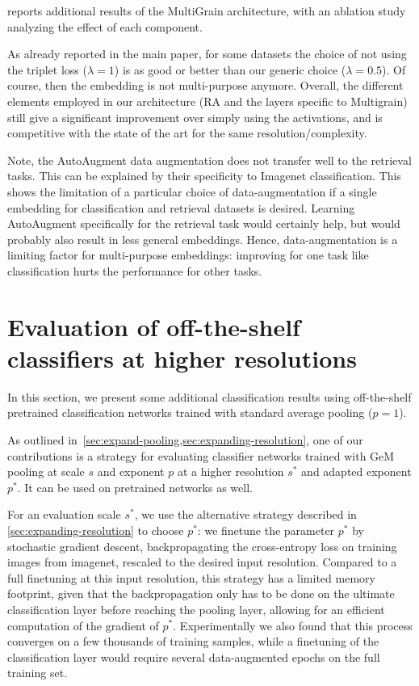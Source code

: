  reports additional results of the MultiGrain architecture, with an ablation study analyzing the effect of each component. 

As already reported in the main paper, for some datasets the choice of not using the triplet loss ($\lambda=1$) is as good or better than our generic choice ($\lambda=0.5$). 
Of course, then the embedding is not multi-purpose anymore. 
Overall, the different elements employed in our architecture (RA and the layers specific to Multigrain) still give a significant improvement over simply using the activations, and is competitive with the state of the art for the same resolution/complexity. 

Note, the AutoAugment data augmentation does not transfer well to the retrieval tasks. 
This can be explained by their specificity to Imagenet classification. 
This shows the limitation of a particular choice of data-augmentation  if a single embedding for classification and retrieval datasets is desired. 
Learning AutoAugment specifically for the retrieval task would certainly help, but would probably also result in less general embeddings. Hence, data-augmentation is a limiting factor for multi-purpose embeddings: improving for one task like classification hurts the performance for other  tasks. 


%






\section{Evaluation of off-the-shelf classifiers at higher resolutions\label{sec:extra-classif}}

In this section, we present some additional classification results using off-the-shelf pretrained classification networks trained with standard average pooling ($p=1$).

As outlined in~\cref{sec:expand-pooling,sec:expanding-resolution}, one of our contributions is a strategy for evaluating classifier networks trained with GeM pooling at scale $s$ and exponent $p$ at a higher resolution $s^*$ and adapted exponent $p^*$. 
It can be used on pretrained networks as well.

For an evaluation scale $s^*$, we use the alternative strategy described in \cref{sec:expanding-resolution} to choose $p^*$: 
we finetune the parameter $p^*$ by stochastic gradient descent, backpropagating the cross-entropy loss on training images from imagenet, rescaled to the desired input resolution. 
Compared to a full finetuning at this input resolution, this strategy has a limited memory footprint, given that the backpropagation only has to be done on the ultimate classification layer before reaching the pooling layer, allowing for an efficient computation of the gradient of $p^*$.
Experimentally we also found that this process converges on a few thousands of training samples, while a finetuning of the classification layer would  require several data-augmented epochs on the full training set.

